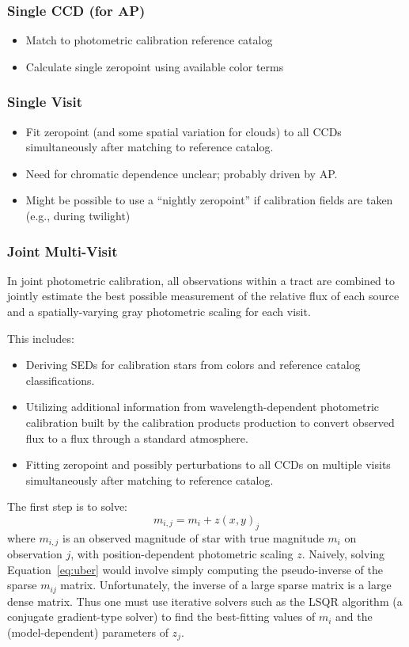 \subsubsection{Single CCD (for AP)}
\label{sec:acSingleCCDPhotometricFit}
\begin{itemize}
\item Match to photometric calibration reference catalog
\item Calculate single zeropoint using available color terms
\end{itemize}
\subsubsection{Single Visit}
\label{sec:acSingleVisitPhotometricFit}
\begin{itemize}
\item Fit zeropoint (and some spatial variation for clouds) to all CCDs simultaneously after matching to reference catalog.
\item Need for chromatic dependence unclear; probably driven by AP.
\item Might be possible to use a ``nightly zeropoint'' if calibration fields are taken (e.g., during twilight)
\end{itemize}


\subsubsection{Joint Multi-Visit}
\label{sec:acJointPhotometricFit}

In joint photometric calibration, all observations within a tract are combined to jointly estimate the best possible measurement of the relative flux of each source and a spatially-varying gray photometric scaling for each visit.

This includes:
\begin{itemize}
\item Deriving SEDs for calibration stars from colors and reference catalog classifications.
\item Utilizing additional information from wavelength-dependent photometric calibration built by the calibration products production to convert observed flux to a flux through a standard atmosphere.
\item Fitting zeropoint and possibly perturbations to all CCDs on multiple visits simultaneously after matching to reference catalog.
\end{itemize}

The first step is to solve:
\begin{equation} \label{eq:uber}
m_{i,j} = m_i + z(x, y)_j
\end{equation}
where $m_{i,j}$ is an observed magnitude of star with true magnitude $m_i$ on observation $j$, with position-dependent photometric scaling $z$.   Naively, solving Equation~\ref{eq:uber} would involve simply computing the pseudo-inverse of the sparse $m_{ij}$ matrix. Unfortunately, the inverse of a large sparse matrix is a large dense matrix.  Thus one must use iterative solvers such as the LSQR algorithm (a conjugate gradient-type solver) to find the best-fitting values of $m_i$ and the (model-dependent) parameters of $z_j$.

